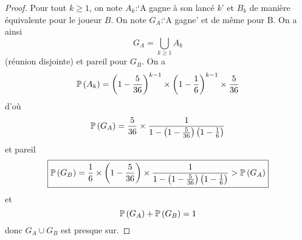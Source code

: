 \documentclass[12pt]{article}
\begin{document}
\begin{proof}
    Pour tout $k\geqslant1$, on note $A_{k}$:`A gagne à son lancé $k$' et $B_{k}$ de manière équivalente pour le joueur $B$. On note $G_{A}$:`A gagne' et de même pour B. On a ainsi
    \begin{equation}
        G_{A}=\bigcup_{k\geqslant 1}A_{k}
    \end{equation}
    (réunion disjointe) et pareil pour $G_{B}$. On a 
    \begin{equation}
        \P\left(A_{k}\right)=\left(1-\frac{5}{36}\right)^{k-1}\times\left(1-\frac{1}{6}\right)^{k-1}\times\frac{5}{36}
    \end{equation}
    d'où 
    \begin{equation}
        \P\left(G_{A}\right)=\frac{5}{36}\times\frac{1}{1-\left(1-\frac{5}{36}\right)\left(1-\frac{1}{6}\right)}
    \end{equation}
    et pareil 
    \begin{equation}
        \boxed{\P\left(G_{B}\right)=\frac{1}{6}\times\left(1-\frac{5}{36}\right)\times\frac{1}{1-\left(1-\frac{5}{36}\right)\left(1-\frac{1}{6}\right)}>\P\left(G_{A}\right)}
    \end{equation}
    et 
    \begin{equation}
        \P\left(G_{A}\right)+\P\left(G_{B}\right)=1
    \end{equation}
    donc $G_{A}\cup G_{B}$ est presque sur.
\end{proof}
\end{document}
